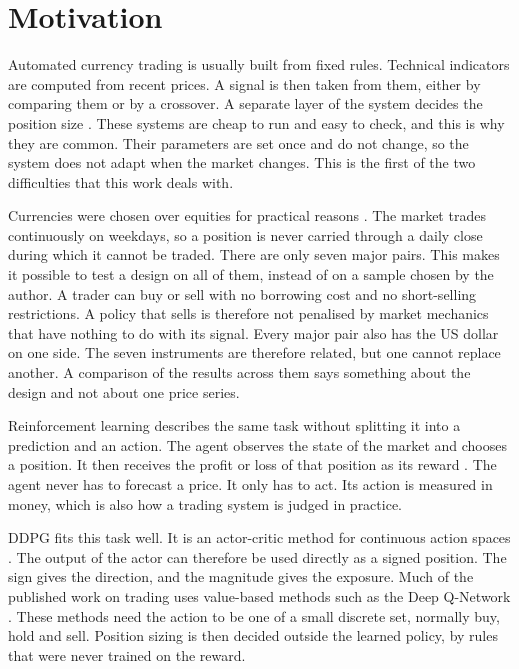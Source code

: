 \section{Motivation}

Automated currency trading is usually built from fixed rules. Technical indicators are computed from recent prices. A signal is then taken from them, either by comparing them or by a crossover. A separate layer of the system decides the position size \cite{chan_quantitative_2021, brandimarte_introduction_2018}. These systems are cheap to run and easy to check, and this is why they are common. Their parameters are set once and do not change, so the system does not adapt when the market changes. This is the first of the two difficulties that this work deals with.

Currencies were chosen over equities for practical reasons \cite{donnelly_art_2019}. The market trades continuously on weekdays, so a position is never carried through a daily close during which it cannot be traded. There are only seven major pairs. This makes it possible to test a design on all of them, instead of on a sample chosen by the author. A trader can buy or sell with no borrowing cost and no short-selling restrictions. A policy that sells is therefore not penalised by market mechanics that have nothing to do with its signal. Every major pair also has the US dollar on one side. The seven instruments are therefore related, but one cannot replace another. A comparison of the results across them says something about the design and not about one price series.

Reinforcement learning describes the same task without splitting it into a prediction and an action. The agent observes the state of the market and chooses a position. It then receives the profit or loss of that position as its reward \cite{sutton_reinforcement_2018}. The agent never has to forecast a price. It only has to act. Its action is measured in money, which is also how a trading system is judged in practice.

DDPG fits this task well. It is an actor-critic method for continuous action spaces \cite{lillicrap_continuous_2015}. The output of the actor can therefore be used directly as a signed position. The sign gives the direction, and the magnitude gives the exposure. Much of the published work on trading uses value-based methods such as the Deep Q-Network \cite{mnih_human-level_2015, fischer_reinforcement_2018, hambly_recent_2023}. These methods need the action to be one of a small discrete set, normally buy, hold and sell. Position sizing is then decided outside the learned policy, by rules that were never trained on the reward.

